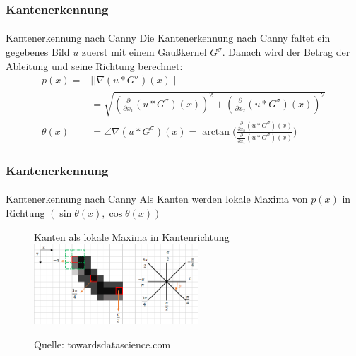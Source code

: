 \documentclass{beamer}
\begin{document}
\begin{frame}
    \frametitle{Kantenerkennung}
\framesubtitle{}

\begin{block}{Kantenerkennung nach Canny}
Die Kantenerkennung nach Canny faltet ein gegebenes Bild $u$ zuerst mit einem Gaußkernel $G^{\sigma}$. Danach wird  der Betrag der Ableitung und seine Richtung berechnet: 
\begin{align*}
p(x) = & || \nabla (u * G^\sigma)(x) || \\
&= \sqrt{ (\frac{\partial}{\partial x_1} (u * G^\sigma)(x))^2 + (\frac{\partial}{\partial x_2} (u * G^\sigma)(x))^2 } \\
\theta(x) & = \angle  \nabla (u * G^\sigma)(x) = \arctan \biggl( \frac{\frac{\partial}{\partial x_2} (u * G^\sigma)(x)}{\frac{\partial}{\partial x_1} (u * G^\sigma)(x)} \biggr)
\end{align*}


 \end{block}

 \end{frame}



\begin{frame}
    \frametitle{Kantenerkennung}
\framesubtitle{}
\begin{block}{Kantenerkennung nach Canny}
Als Kanten werden lokale Maxima von $p(x)$ in Richtung $(\sin \theta(x), \cos \theta(x)  )$
\end{block}
\begin{figure}[htp]
      \centering
Kanten als lokale Maxima in Kantenrichtung \\
    \includegraphics[width=0.55\textwidth]{images/canny_max} 
      \caption{Quelle: towardsdatascience.com}
\end{figure}

 \end{frame}
\end{document}
